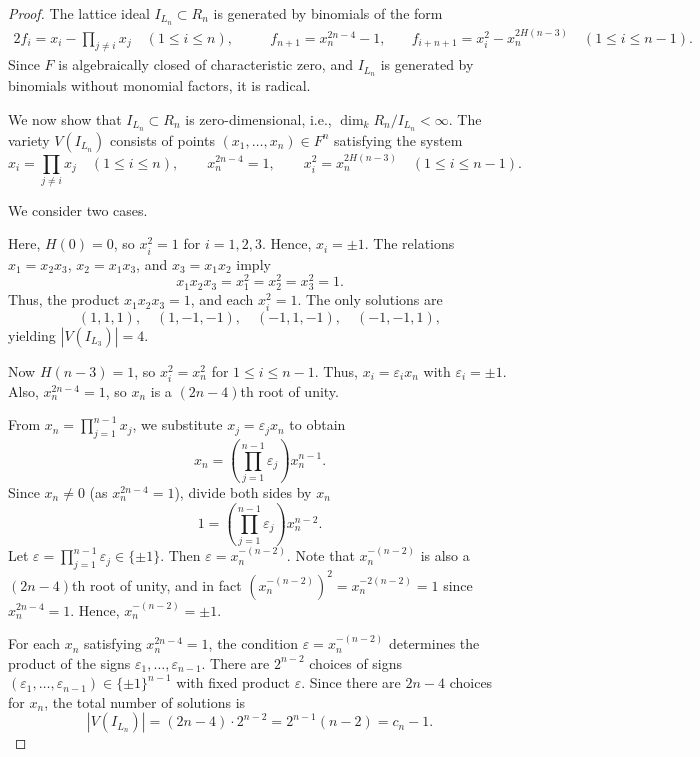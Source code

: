 \documentclass[11pt]{amsart}
\theoremstyle{plain}
\theoremstyle{definition}
\theoremstyle{remark}
\begin{document}
\begin{proof}
	The lattice ideal \( I_{L_n} \subset R_n \) is generated by binomials of the form 
	\begin{alignat}{2}
	\label{eq:main}
	f_i = x_i - \prod_{j \neq i} x_j \quad (1 \leq i \leq n), & & \quad f_{n+1} = x_n^{2n-4} - 1, &\quad f_{i+n+1} = x_i^2 - x_n^{2H(n-3)} \quad (1 \leq i \leq n-1).  \end{alignat} Since \( F \) is algebraically closed of characteristic zero, and \( I_{L_n} \) is generated by binomials without monomial factors, it is radical.
	
	We now show that \( I_{L_n} \subset R_n \) is zero-dimensional, i.e., \( \dim_k R_n / I_{L_n} < \infty \). The variety \( V(I_{L_n}) \) consists of points \( (x_1, \dots, x_n) \in F^n \) satisfying the system
	\[
	x_i = \prod_{j \neq i} x_j \quad (1 \leq i \leq n), \qquad x_n^{2n-4} = 1, \qquad x_i^2 = x_n^{2H(n-3)} \quad (1 \leq i \leq n-1).
	\]
	
	We consider two cases.
	
	Here, \( H(0) = 0 \), so \( x_i^2 = 1 \) for \( i = 1, 2, 3 \). Hence, \( x_i = \pm 1 \). The relations \( x_1 = x_2 x_3 \), \( x_2 = x_1 x_3 \), and \( x_3 = x_1 x_2 \) imply
	\[
	x_1 x_2 x_3 = x_1^2 = x_2^2 = x_3^2 = 1.
	\]
	Thus, the product \( x_1 x_2 x_3 = 1 \), and each \( x_i^2 = 1 \). The only solutions are
	\[
	(1,1,1), \quad (1,-1,-1), \quad (-1,1,-1), \quad (-1,-1,1),
	\]
	yielding \( |V(I_{L_3})| = 4 \).
	
	Now \( H(n-3) = 1 \), so \( x_i^2 = x_n^2 \) for \( 1 \leq i \leq n-1 \). Thus, \( x_i = \varepsilon_i x_n \) with \( \varepsilon_i = \pm 1 \). Also, \( x_n^{2n-4} = 1 \), so \( x_n \) is a \( (2n-4) \)th root of unity.
	
	From \( x_n = \prod_{j=1}^{n-1} x_j \), we substitute \( x_j = \varepsilon_j x_n \) to obtain
	\[
	x_n = \left( \prod_{j=1}^{n-1} \varepsilon_j \right) x_n^{n-1}.
	\]
	Since \( x_n \neq 0 \) (as \( x_n^{2n-4}=1 \)), divide both sides by \( x_n \)
	\[
	1 = \left( \prod_{j=1}^{n-1} \varepsilon_j \right) x_n^{n-2}.
	\]
	Let \( \varepsilon = \prod_{j=1}^{n-1} \varepsilon_j \in \{ \pm 1 \} \). Then \( \varepsilon = x_n^{-(n-2)} \). Note that \( x_n^{-(n-2)} \) is also a \( (2n-4) \)th root of unity, and in fact \( (x_n^{-(n-2)})^2 = x_n^{-2(n-2)} = 1 \) since \( x_n^{2n-4} = 1 \). Hence, \( x_n^{-(n-2)} = \pm 1 \).
	
	For each \( x_n \) satisfying \( x_n^{2n-4} = 1 \), the condition \( \varepsilon = x_n^{-(n-2)} \) determines the product of the signs \( \varepsilon_1, \ldots, \varepsilon_{n-1} \). There are \( 2^{n-2} \) choices of signs \( (\varepsilon_1, \ldots, \varepsilon_{n-1}) \in \{ \pm 1 \}^{n-1} \) with fixed product \( \varepsilon \). Since there are \( 2n-4 \) choices for \( x_n \), the total number of solutions is
	\[
	|V(I_{L_n})| = (2n-4) \cdot 2^{n-2} = 2^{n-1}(n-2) = c_n - 1.
	\]	
	

\end{proof}
\end{document}
